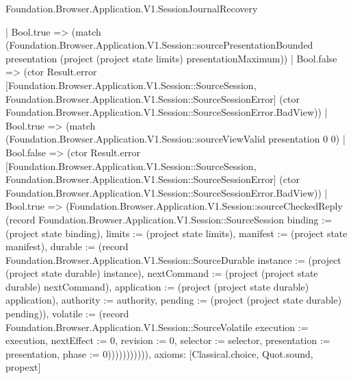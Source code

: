 \begin{lexlean}{Foundation.Browser.Application.V1.SessionJournalRecovery}
\begin{semanticmodule}
{              | Bool.true => (match (Foundation.Browser.Application.V1.Session::sourcePresentationBounded presentation (project (project state limits) presentationMaximum))
                | Bool.false => (ctor Result.error [Foundation.Browser.Application.V1.Session::SourceSession, Foundation.Browser.Application.V1.Session::SourceSessionError] (ctor Foundation.Browser.Application.V1.Session::SourceSessionError.BadView))
                | Bool.true => (match (Foundation.Browser.Application.V1.Session::sourceViewValid presentation 0 0)
                  | Bool.false => (ctor Result.error [Foundation.Browser.Application.V1.Session::SourceSession, Foundation.Browser.Application.V1.Session::SourceSessionError] (ctor Foundation.Browser.Application.V1.Session::SourceSessionError.BadView))
                  | Bool.true => (Foundation.Browser.Application.V1.Session::sourceCheckedReply (record Foundation.Browser.Application.V1.Session::SourceSession {binding := (project state binding), limits := (project state limits), manifest := (project state manifest), durable := (record Foundation.Browser.Application.V1.Session::SourceDurable {instance := (project (project state durable) instance), nextCommand := (project (project state durable) nextCommand), application := (project (project state durable) application), authority := authority, pending := (project (project state durable) pending)}), volatile := (record Foundation.Browser.Application.V1.Session::SourceVolatile {execution := execution, nextEffect := 0, revision := 0, selector := selector, presentation := presentation, phase := 0})})))))))))),
  axioms: [Classical.choice, Quot.sound, propext]
}


\end{semanticmodule}
\end{lexlean}
